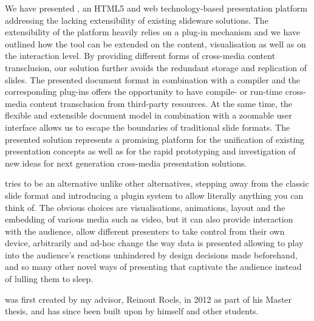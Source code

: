     We have presented \mxp, an HTML5 and web technology-based presentation
    platform addressing the lacking extensibility of existing slideware
    solutions. The extensibility of the \mxp platform heavily relies on a
    plug-in mechanism and we have outlined how the tool can be extended on the
    content, visualisation as well as on the interaction level. By providing
    different forms of cross-media content transclusion, our solution further
    avoids the redundant storage and replication of slides. The presented \mxp
    document format in combination with a compiler and the corresponding
    plug-ins offers the opportunity to have compile- or run-time cross-media
    content transclusion from third-party resources. At the same time, the
    flexible and extensible document model in combination with a zoomable user
    interface allows us to escape the boundaries of traditional slide formats.
    The presented \mxp solution represents a promising platform for the
    unification of existing presentation concepts as well as for the rapid
    prototyping and investigation of new ideas for next generation cross-media
    presentation solutions.



    \mxp tries to be an alternative unlike other alternatives, stepping away
    from the classic slide format and introducing a plugin system to allow
    literally anything you can think of. The obvious choices are
    visualisations, animations, layout and the embedding of various media such
    as video, but it can also provide interaction with the audience, allow
    different presenters to take control from their own device, arbitrarily and
    ad-hoc change the way data is presented allowing to play into the
    audience's reactions unhindered by design decisions made beforehand, and so
    many other novel ways of presenting that captivate the audience instead of
    lulling them to sleep.

    \mxp was first created by my advisor, Reinout Roels, in 2012 as part of his
    Master thesis, and has since been built upon by himself and other students.


